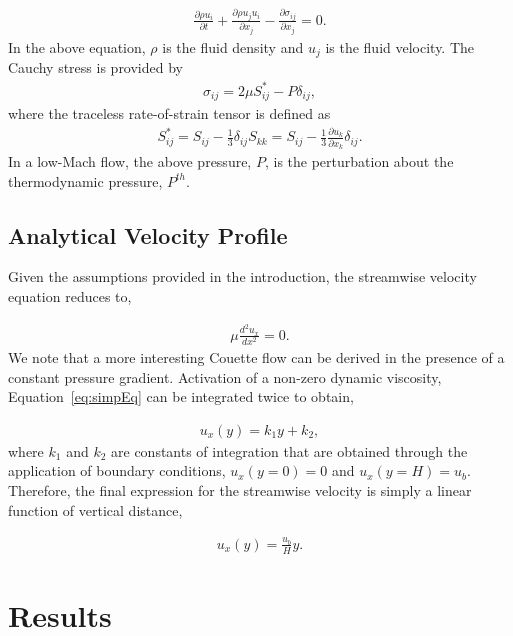 \documentclass{article}
\begin{document}
\begin{align}
  \frac {\partial \rho u_i }{\partial t} + \frac{ \partial \rho u_j u_i}{\partial x_j} 
-\frac{\partial \sigma_{ij}}{\partial x_j} = 0.
\label{eq:momEq}
\end{align}
%
In the above equation, $\rho$ is the fluid density and $u_j$ is the fluid velocity. 
The Cauchy stress is provided by
\begin{align}
\sigma_{ij}  = 2 \mu S^*_{ij} - P \delta_{ij},
\end{align}
%
where the traceless rate-of-strain tensor is defined as
\begin{align}
S^*_{ij}  = S_{ij} - \frac{1}{3} \delta_{ij} S_{kk} \nonumber
		     = S_{ij} - \frac{1}{3} \frac{\partial  u_k }{\partial x_k}\delta_{ij}.
\end{align}
In a low-Mach flow, the above pressure, $P$, is the perturbation about the thermodynamic
pressure, $P^{th}$. 

\subsection{Analytical Velocity Profile}
Given the assumptions provided in the introduction, the streamwise velocity equation reduces to,

\begin{align}
   \mu \frac{d^2 u_x}{dx^2} = 0.
\label{eq:simpEq}
\end{align}
We note that a more interesting Couette flow can be derived in the presence of a constant pressure 
gradient. Activation of a non-zero dynamic viscosity, Equation~\ref{eq:simpEq} can be 
integrated twice to obtain,

\begin{align}
  u_x(y) = k_1 y + k_2,
\label{eq:simpEqWithK}
\end{align}
where $k_1$ and $k_2$ are constants of integration that are obtained through the 
application of boundary conditions, $u_x(y=0) = 0$ and  $u_x(y=H) = u_b$. Therefore,
the final expression for the streamwise velocity is simply a linear function of vertical
distance,

\begin{align}
  u_x(y) = \frac{u_b}{H}y.
\label{eq:simpleEqWithoutK}
\end{align}

\section{Results}
\end{document}
